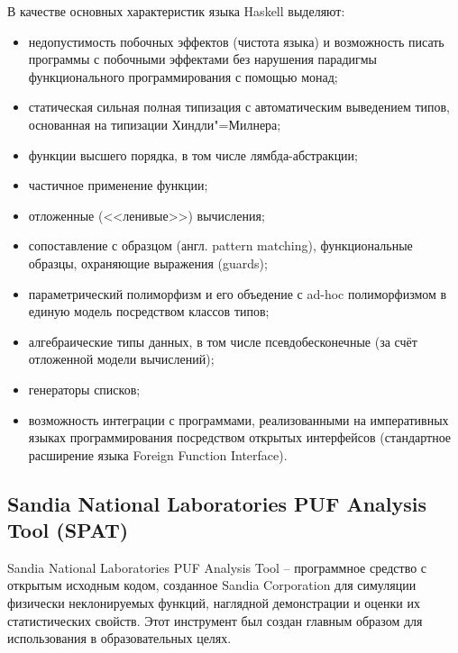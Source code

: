 В качестве основных характеристик языка Haskell выделяют:
\begin{itemize}
  \item недопустимость побочных эффектов (чистота языка) и возможность писать программы с побочными эффектами без нарушения парадигмы функционального программирования с помощью монад;
  \item статическая сильная полная типизация с автоматическим выведением типов, основанная на типизации Хиндли"=Милнера;
  \item функции высшего порядка, в том числе лямбда-абстракции;
  \item частичное применение функции;
  \item отложенные (<<ленивые>>) вычисления;
  \item сопоставление с образцом (англ. pattern matching), функциональные образцы, охраняющие выражения (guards);
  \item параметрический полиморфизм и его объедение с ad-hoc полиморфизмом в единую модель посредством классов типов;
  \item алгебраические типы данных, в том числе псевдобесконечные (за счёт отложенной модели вычислений);
  \item генераторы списков;
  \item возможность интеграции с программами, реализованными на императивных языках программирования посредством открытых интерфейсов (стандартное расширение языка Foreign Function Interface).
\end{itemize}



\subsection{Sandia National Laboratories PUF Analysis Tool (SPAT)}
\label{sec:techs:spat}
Sandia National Laboratories PUF Analysis Tool -- программное средство с открытым исходным кодом, созданное Sandia Corporation для симуляции физически неклонируемых функций, наглядной демонстрации и оценки их статистических свойств. Этот инструмент был создан главным образом для использования в образовательных целях.

